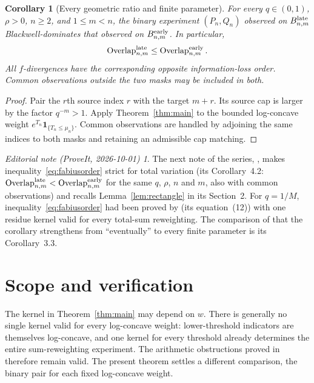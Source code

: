 \documentclass[11pt,a4paper]{article}
\newtheorem{corollary}[theorem]{Corollary}\newtheorem{proposition}[theorem]{Proposition}
\theoremstyle{remark}\newtheorem*{ednote}{Editorial note (ProveIt, 2026-10-01)}
\newcommand{\ind}{\mathbf1}\newcommand{\dd}{\,\mathrm d}
\begin{document}
\begin{corollary}[Every geometric ratio and finite parameter]\label{cor:fabius}
For every $q\in(0,1)$, $\rho>0$, $n\ge2$, and $1\le m<n$, the binary experiment $(P_n,Q_n)$ observed on $B^{\rm late}_{n,m}$ Blackwell-dominates that observed on $B^{\rm early}_{n,m}$. In particular,
\begin{equation}\label{eq:fabiusorder}
 \operatorname{Overlap}^{\rm late}_{n,m}
 \le\operatorname{Overlap}^{\rm early}_{n,m}.
\end{equation}
All $f$-divergences have the corresponding opposite information-loss order. Common observations outside the two masks may be included in both.
\end{corollary}
\begin{proof}
Pair the $r$th source index $r$ with the target $m+r$. Its source cap is larger by the factor $q^{-m}>1$. Apply Theorem~\ref{thm:main} to the bounded log-concave weight $e^{T_n}\ind_{\{T_n\le\mu_n\}}$. Common observations are handled by adjoining the same indices to both masks and retaining an admissible cap matching.
\end{proof}
\begin{ednote}
The next note of the series, ,
makes inequality~\eqref{eq:fabiusorder} strict for total variation (its
Corollary~4.2: $\operatorname{Overlap}^{\rm late}_{n,m}<
\operatorname{Overlap}^{\rm early}_{n,m}$ for the same $q$, $\rho$, $n$ and
$m$, also with common observations) and recalls Lemma~\ref{lem:rectangle} in
its Section~2. For $q=1/M$, inequality~\eqref{eq:fabiusorder} had been proved
by  (its equation~(12)) with one residue
kernel valid for every total-sum reweighting. The comparison of
\cite{SecondOrder} that the corollary strengthens from ``eventually'' to every
finite parameter is its Corollary~3.3.
\end{ednote}

\section{Scope and verification}
The kernel in Theorem~\ref{thm:main} may depend on $w$. There is generally no single kernel valid for every log-concave weight: lower-threshold indicators are themselves log-concave, and one kernel for every threshold already determines the entire sum-reweighting experiment. The arithmetic obstructions proved in \cite{Arithmetic} therefore remain valid. The present theorem settles a different comparison, the binary pair for each fixed log-concave weight.
\end{document}
